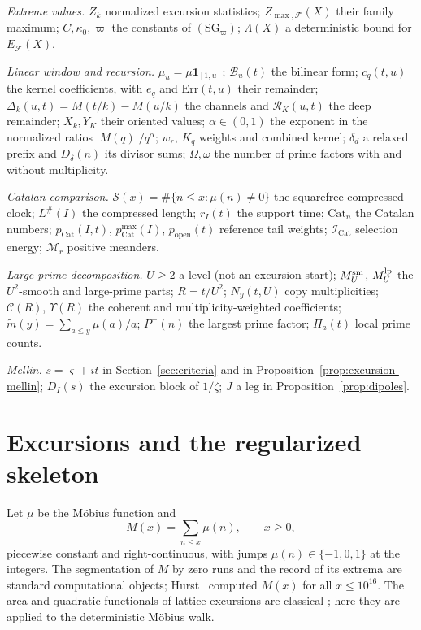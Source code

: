 \documentclass[11pt]{amsart}
\numberwithin{equation}{section}
\theoremstyle{plain}
\theoremstyle{definition}
\theoremstyle{remark}
\newcommand{\Pp}{P^{+}}
\newcommand{\Cc}{\mathcal{C}}
\newcommand{\Sq}{\mathcal{S}}
\newcommand{\mt}{\widetilde{m}}
\newcommand{\F}{\mathcal{F}}
\begin{document}
\smallskip
\noindent\emph{Extreme values.}
$Z_k$ normalized excursion statistics; $Z_{\max,\F}(X)$ their family maximum;
$C,\kappa_0,\varpi$ the constants of $(\mathrm{SG}_\varpi)$;
$\Lambda(X)$ a deterministic bound for $E_\F(X)$.

\smallskip
\noindent\emph{Linear window and recursion.}
$\mu_u=\mu\mathbf 1_{[1,u]}$; $\mathcal B_u(t)$ the bilinear form;
$c_q(t,u)$ the kernel coefficients, with $e_q$ and $\mathrm{Err}(t,u)$
their remainder; $\Delta_k(u,t)=M(t/k)-M(u/k)$ the channels and
$\mathcal R_K(u,t)$ the deep remainder; $X_k,Y_K$ their oriented values;
$\alpha\in(0,1)$ the exponent in the normalized ratios
$|M(q)|/q^\alpha$; $w_r$, $K_q$ weights and combined kernel;
$\delta_d$ a relaxed prefix and $D_\delta(n)$ its divisor sums;
$\Omega,\omega$ the number of prime factors with and without multiplicity.

\smallskip
\noindent\emph{Catalan comparison.}
$\Sq(x)=\#\{n\le x:\mu(n)\ne0\}$ the squarefree-compressed clock;
$L^\#(I)$ the compressed length; $r_I(t)$ the support time;
$\mathrm{Cat}_n$ the Catalan numbers; $p_{\mathrm{Cat}}(I,t)$,
$p^{\max}_{\mathrm{Cat}}(I)$, $p_{\mathrm{open}}(t)$ reference tail weights;
$\mathcal I_{\mathrm{Cat}}$ selection energy; $\mathcal M_r$ positive meanders.

\smallskip
\noindent\emph{Large-prime decomposition.}
$U\ge2$ a level (not an excursion start); $M^{\rm sm}_U$, $M^{\rm lp}_U$ the
$U^2$-smooth and large-prime parts; $R=t/U^2$; $N_y(t,U)$ copy
multiplicities; $\Cc(R)$, $\Upsilon(R)$ the coherent and multiplicity-weighted
coefficients; $\mt(y)=\sum_{a\le y}\mu(a)/a$; $\Pp(n)$ the largest prime
factor; $\Pi_a(t)$ local prime counts.

\smallskip
\noindent\emph{Mellin.}
$s=\varsigma+it$ in Section~\ref{sec:criteria} and in
Proposition~\ref{prop:excursion-mellin}; $D_I(s)$ the excursion block of
$1/\zeta$; $J$ a leg in Proposition~\ref{prop:dipoles}.

\section{Excursions and the regularized skeleton}
\label{sec:definitions}

Let $\mu$ be the M\"obius function and
\begin{equation}
\label{eq:mertens_def}
M(x)=\sum_{n\le x}\mu(n),\qquad x\ge0,
\end{equation}
piecewise constant and right-continuous, with jumps $\mu(n)\in\{-1,0,1\}$
at the integers. The segmentation of $M$ by zero runs and the record of its
extrema are standard computational objects; Hurst~\cite{Hurst18} computed
$M(x)$ for all $x\le10^{16}$. The area and quadratic functionals of lattice
excursions are classical
\cite{Takacs91,NguyenThe04,Richard05,Janson07,DKW15,CP17}; here they are
applied to the deterministic M\"obius walk.
\end{document}
